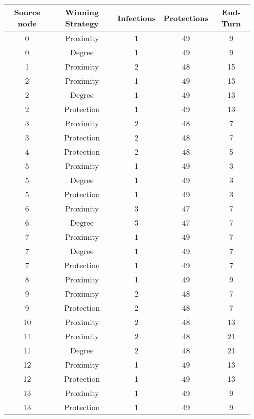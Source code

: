 \documentclass[results.tex]{subfiles}
\begin{document}
\begin{center}
  \begin{tabular}{| c || c | c | c | c |}
    \hline
    {\bfseries Source node} & {\bfseries Winning Strategy} & {\bfseries Infections} & {\bfseries Protections} & {\bfseries End-Turn} \\  %
    \hline\hline
    0 & Proximity & 1 & 49 & 9 \\ 
    \hline
    0 & Degree & 1 & 49 & 9 \\ 
    \hline
    1 & Proximity & 2 & 48 & 15 \\ 
    \hline
    2 & Proximity & 1 & 49 & 13 \\ 
    \hline
    2 & Degree & 1 & 49 & 13 \\ 
    \hline
    2 & Protection & 1 & 49 & 13 \\ 
    \hline
    3 & Proximity & 2 & 48 & 7 \\ 
    \hline
    3 & Protection & 2 & 48 & 7 \\ 
    \hline
    4 & Protection & 2 & 48 & 5 \\ 
    \hline
    5 & Proximity & 1 & 49 & 3 \\ 
    \hline
    5 & Degree & 1 & 49 & 3 \\ 
    \hline
    5 & Protection & 1 & 49 & 3 \\ 
    \hline
    6 & Proximity & 3 & 47 & 7 \\ 
    \hline
    6 & Degree & 3 & 47 & 7 \\ 
    \hline
    7 & Proximity & 1 & 49 & 7 \\ 
    \hline
    7 & Degree & 1 & 49 & 7 \\ 
    \hline
    7 & Protection & 1 & 49 & 7 \\ 
    \hline
    8 & Proximity & 1 & 49 & 9 \\ 
    \hline
    9 & Proximity & 2 & 48 & 7 \\ 
    \hline
    9 & Protection & 2 & 48 & 7 \\ 
    \hline
    10 & Proximity & 2 & 48 & 13 \\ 
    \hline
    11 & Proximity & 2 & 48 & 21 \\ 
    \hline
    11 & Degree & 2 & 48 & 21 \\ 
    \hline
    12 & Proximity & 1 & 49 & 13 \\ 
    \hline
    12 & Protection & 1 & 49 & 13 \\ 
    \hline
    13 & Proximity & 1 & 49 & 9 \\ 
    \hline
    13 & Protection & 1 & 49 & 9 \\ 

\end{tabular}
\end{center}
\end{document}
